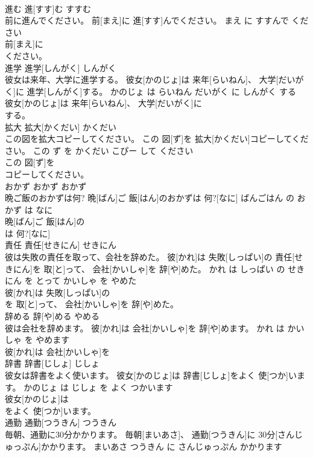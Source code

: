 \documentclass[8pt]{extreport}
\begin{document}
\begin{CJK}{UTF8}{min}
\\	進む	進[すす]む	すすむ	
\\	前に進んでください。	前[まえ]に 進[すす]んでください。	まえ に すすんで ください	
\\	前[まえ]に
\\	ください。			
\\	進学	進学[しんがく]	しんがく	
\\	彼女は来年、大学に進学する。	彼女[かのじょ]は 来年[らいねん]、 大学[だいがく]に 進学[しんがく]する。	かのじょ は らいねん だいがく に しんがく する	
\\	彼女[かのじょ]は 来年[らいねん]、 大学[だいがく]に
\\	する。			
\\	拡大	拡大[かくだい]	かくだい	
\\	この図を拡大コピーしてください。	この 図[ず]を 拡大[かくだい]コピーしてください。	この ず を かくだい こぴー して ください	
\\	この 図[ず]を
\\	コピーしてください。			
\\	おかず	おかず	おかず	
\\	晩ご飯のおかずは何?	晩[ばん]ご 飯[はん]のおかずは 何?[なに]	ばんごはん の おかず は なに	
\\	晩[ばん]ご 飯[はん]の
\\	は 何?[なに]			
\\	責任	責任[せきにん]	せきにん	
\\	彼は失敗の責任を取って、会社を辞めた。	彼[かれ]は 失敗[しっぱい]の 責任[せきにん]を 取[と]って、 会社[かいしゃ]を 辞[や]めた。	かれ は しっぱい の せきにん を とって かいしゃ を やめた	
\\	彼[かれ]は 失敗[しっぱい]の
\\	を 取[と]って、 会社[かいしゃ]を 辞[や]めた。			
\\	辞める	辞[や]める	やめる	
\\	彼は会社を辞めます。	彼[かれ]は 会社[かいしゃ]を 辞[や]めます。	かれ は かいしゃ を やめます	
\\	彼[かれ]は 会社[かいしゃ]を
\\	辞書	辞書[じしょ]	じしょ	
\\	彼女は辞書をよく使います。	彼女[かのじょ]は 辞書[じしょ]をよく 使[つか]います。	かのじょ は じしょ を よく つかいます	
\\	彼女[かのじょ]は
\\	をよく 使[つか]います。			
\\	通勤	通勤[つうきん]	つうきん	
\\	毎朝、通勤に30分かかります。	毎朝[まいあさ]、 通勤[つうきん]に 30分[さんじゅっぷん]かかります。	まいあさ つうきん に さんじゅっぷん かかります	

\end{CJK}
\end{document}
